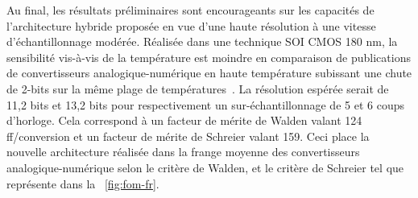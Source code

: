 \begin{mdframed}[linecolor=Prune,linewidth=1]
Au final, les résultats préliminaires sont encourageants sur les capacités de l'architecture hybride proposée en vue d'une haute résolution à une vitesse d'échantillonnage modérée. Réalisée dans une technique SOI CMOS 180 nm, la sensibilité vis-à-vis de la température est moindre en comparaison de publications de convertisseurs analogique-numérique en haute température subissant une chute de 2-bits sur la même plage de températures~\cite{Ericson2004}. La résolution espérée serait de 11,2 bits et 13,2 bits pour respectivement un sur-échantillonnage de 5 et 6 coups d'horloge. Cela correspond à un facteur de mérite de Walden valant 124 ff/conversion et un facteur de mérite de Schreier valant 159. Ceci place la nouvelle architecture réalisée dans la frange moyenne des convertisseurs analogique-numérique selon le critère de Walden, et le critère de Schreier tel que représente dans la \figurename~\ref{fig:fom-fr}.


\end{mdframed}
